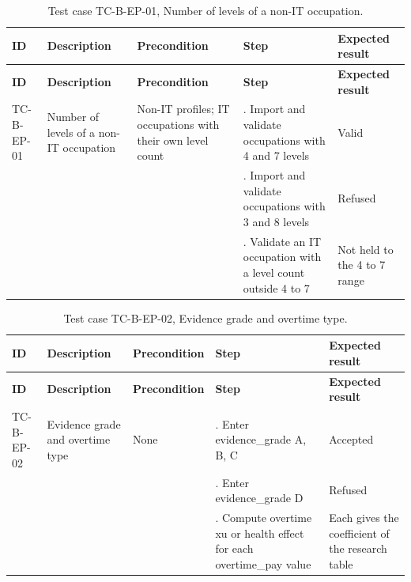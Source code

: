 {\small
\begin{longtable}{|>{\raggedright\arraybackslash}p{}|>{\raggedright\arraybackslash}p{}|>{\raggedright\arraybackslash}p{}|>{\raggedright\arraybackslash}p{}|>{\raggedright\arraybackslash}p{}|}
\caption{Test case TC-B-EP-01, Number of levels of a non-IT occupation.} \\
\hline
\textbf{ID} & \textbf{Description} & \textbf{Precondition} & \textbf{Step} & \textbf{Expected result} \\ \hline
\endfirsthead
\hline
\textbf{ID} & \textbf{Description} & \textbf{Precondition} & \textbf{Step} & \textbf{Expected result} \\ \hline
\endhead
TC-B-EP-01 & Number of levels of a non-IT occupation & Non-IT profiles; IT occupations with their own level count & 1. Import and validate occupations with 4 and 7 levels & Valid \\ \hline
 &  &  & 2. Import and validate occupations with 3 and 8 levels & Refused \\ \hline
 &  &  & 3. Validate an IT occupation with a level count outside 4 to 7 & Not held to the 4 to 7 range \\ \hline
\end{longtable}
}

{\small
\begin{longtable}{|>{\raggedright\arraybackslash}p{}|>{\raggedright\arraybackslash}p{}|>{\raggedright\arraybackslash}p{}|>{\raggedright\arraybackslash}p{}|>{\raggedright\arraybackslash}p{}|}
\caption{Test case TC-B-EP-02, Evidence grade and overtime type.} \\
\hline
\textbf{ID} & \textbf{Description} & \textbf{Precondition} & \textbf{Step} & \textbf{Expected result} \\ \hline
\endfirsthead
\hline
\textbf{ID} & \textbf{Description} & \textbf{Precondition} & \textbf{Step} & \textbf{Expected result} \\ \hline
\endhead
TC-B-EP-02 & Evidence grade and overtime type & None & 1. Enter evidence\_grade A, B, C & Accepted \\ \hline
 &  &  & 2. Enter evidence\_grade D & Refused \\ \hline
 &  &  & 3. Compute overtime xu or health effect for each overtime\_pay value & Each gives the coefficient of the research table \\ \hline
\end{longtable}
}


